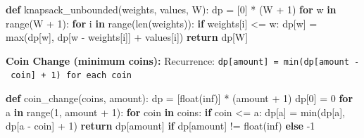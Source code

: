 \documentclass[11pt]{article}
\newenvironment{Shaded}{\begin{snugshade}}{\end{snugshade}}
\newcommand{\BuiltInTok}[1]{\textcolor[rgb]{0.50,0.55,0.55}{#1}}
\newcommand{\ControlFlowTok}[1]{\textcolor[rgb]{0.99,0.74,0.29}{\textbf{#1}}}
\newcommand{\DecValTok}[1]{\textcolor[rgb]{0.96,0.45,0.00}{#1}}
\newcommand{\KeywordTok}[1]{\textcolor[rgb]{0.81,0.81,0.76}{\textbf{#1}}}
\newcommand{\NormalTok}[1]{\textcolor[rgb]{0.81,0.81,0.76}{#1}}
\newcommand{\OperatorTok}[1]{\textcolor[rgb]{0.81,0.81,0.76}{#1}}
\newcommand{\StringTok}[1]{\textcolor[rgb]{0.96,0.31,0.31}{#1}}
\begin{document}

\begin{Shaded}
\begin{Highlighting}[]
\KeywordTok{def}\NormalTok{ knapsack\_unbounded(weights, values, W):}
\NormalTok{    dp }\OperatorTok{=}\NormalTok{ [}\DecValTok{0}\NormalTok{] }\OperatorTok{*}\NormalTok{ (W }\OperatorTok{+} \DecValTok{1}\NormalTok{)}
    \ControlFlowTok{for}\NormalTok{ w }\KeywordTok{in} \BuiltInTok{range}\NormalTok{(W }\OperatorTok{+} \DecValTok{1}\NormalTok{):}
        \ControlFlowTok{for}\NormalTok{ i }\KeywordTok{in} \BuiltInTok{range}\NormalTok{(}\BuiltInTok{len}\NormalTok{(weights)):}
            \ControlFlowTok{if}\NormalTok{ weights[i] }\OperatorTok{\textless{}=}\NormalTok{ w:}
\NormalTok{                dp[w] }\OperatorTok{=} \BuiltInTok{max}\NormalTok{(dp[w], dp[w }\OperatorTok{{-}}\NormalTok{ weights[i]] }\OperatorTok{+}\NormalTok{ values[i])}
    \ControlFlowTok{return}\NormalTok{ dp[W]}
\end{Highlighting}
\end{Shaded}

\textbf{Coin Change (minimum coins):}
Recurrence: \texttt{dp{[}amount{]}\ =\ min(dp{[}amount\ -\ coin{]}\ +\ 1)\ for\ each\ coin}


\begin{Shaded}
\begin{Highlighting}[]
\KeywordTok{def}\NormalTok{ coin\_change(coins, amount):}
\NormalTok{    dp }\OperatorTok{=}\NormalTok{ [}\BuiltInTok{float}\NormalTok{(}\StringTok{\textquotesingle{}inf\textquotesingle{}}\NormalTok{)] }\OperatorTok{*}\NormalTok{ (amount }\OperatorTok{+} \DecValTok{1}\NormalTok{)}
\NormalTok{    dp[}\DecValTok{0}\NormalTok{] }\OperatorTok{=} \DecValTok{0}
    \ControlFlowTok{for}\NormalTok{ a }\KeywordTok{in} \BuiltInTok{range}\NormalTok{(}\DecValTok{1}\NormalTok{, amount }\OperatorTok{+} \DecValTok{1}\NormalTok{):}
        \ControlFlowTok{for}\NormalTok{ coin }\KeywordTok{in}\NormalTok{ coins:}
            \ControlFlowTok{if}\NormalTok{ coin }\OperatorTok{\textless{}=}\NormalTok{ a:}
\NormalTok{                dp[a] }\OperatorTok{=} \BuiltInTok{min}\NormalTok{(dp[a], dp[a }\OperatorTok{{-}}\NormalTok{ coin] }\OperatorTok{+} \DecValTok{1}\NormalTok{)}
    \ControlFlowTok{return}\NormalTok{ dp[amount] }\ControlFlowTok{if}\NormalTok{ dp[amount] }\OperatorTok{!=} \BuiltInTok{float}\NormalTok{(}\StringTok{\textquotesingle{}inf\textquotesingle{}}\NormalTok{) }\ControlFlowTok{else} \OperatorTok{{-}}\DecValTok{1}
\end{Highlighting}
\end{Shaded}
\end{document}
